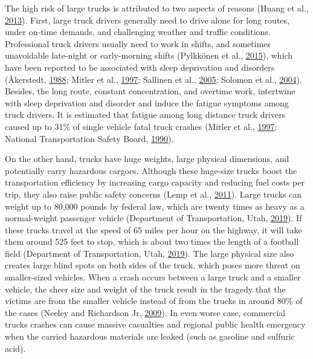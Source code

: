 \documentclass[12pt]{book}
\numberwithin{equation}{chapter}
\begin{document}
The high risk of large trucks is attributed to two aspects of reasons (Huang et al., \protect\hyperlink{ref-huang2013development}{2013}). First, large truck drivers generally need to drive alone for long routes, under on-time demands, and challenging weather and traffic conditions. Professional truck drivers usually need to work in shifts, and sometimes unavoidable late-night or early-morning shifts (Pylkkönen et al., \protect\hyperlink{ref-pylkkonen2015sleepiness}{2015}), which have been reported to be associated with sleep deprivation and disorders (Åkerstedt, \protect\hyperlink{ref-aakerstedt1988sleepiness}{1988}; Mitler et al., \protect\hyperlink{ref-mitler1997sleep}{1997}; Sallinen et al., \protect\hyperlink{ref-sallinen2005sleepiness}{2005}; Solomon et al., \protect\hyperlink{ref-solomon2004healthcare}{2004}). Besides, the long route, constant concentration, and overtime work, intertwine with sleep deprivation and disorder and induce the fatigue symptoms among truck drivers. It is estimated that fatigue among long distance truck drivers caused up to 31\% of single vehicle fatal truck crashes (Mitler et al., \protect\hyperlink{ref-mitler1997sleep}{1997}; National Transportation Safety Board, \protect\hyperlink{ref-ntsb1990}{1990}).

On the other hand, trucks have huge weights, large physical dimensions, and potentially carry hazardous cargoes. Although these huge-size trucks boost the transportation efficiency by increasing cargo capacity and reducing fuel costs per trip, they also raise public safety concerns (Lemp et al., \protect\hyperlink{ref-lemp2011analysis}{2011}). Large trucks can weight up to 80,000 pounds by federal law, which are twenty times as heavy as a normal-weight passenger vehicle (Department of Transportation, Utah, \protect\hyperlink{ref-utah2019}{2019}). If these trucks travel at the speed of 65 miles per hour on the highway, it will take them around 525 feet to stop, which is about two times the length of a football field (Department of Transportation, Utah, \protect\hyperlink{ref-utah2019}{2019}). The large physical size also creates large blind spots on both sides of the truck, which poses more threat on smaller-sized vehicles. When a crash occurs between a large truck and a smaller vehicle, the sheer size and weight of the truck result in the tragedy that the victims are from the smaller vehicle instead of from the trucks in around 80\% of the cases (Neeley and Richardson Jr, \protect\hyperlink{ref-neeley2009effect}{2009}). In even worse case, commercial trucks crashes can cause massive casualties and regional public health emergency when the carried hazardous materials are leaked (such as gasoline and sulfuric acid).
\end{document}
